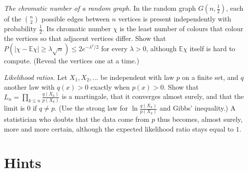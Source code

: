 \begin{exercise}[$\star\star$]\label{ex:chromatic}
\emph{The chromatic number of a random graph.} In the random graph $G(n,\frac12)$, each of the $\binom n2$ possible edges between $n$ vertices is
present independently with probability $\frac12$. Its chromatic number $\chi$ is the least number of colours that colour the vertices so
that adjacent vertices differ. Show that $P(|\chi-\mathbb E\chi|\ge\lambda\sqrt n)\le2e^{-\lambda^2/2}$ for every $\lambda>0$, although $\mathbb E\chi$ itself is hard to compute. (Reveal the vertices one at a time.)
\end{exercise}

\begin{exercise}[$\star\star$]\label{ex:likelihood}
\emph{Likelihood ratios.} Let $X_1,X_2,\ldots$ be independent with law $p$ on a finite set, and $q$ another law with $q(x)>0$ exactly when $p(x)>0$. Show
that $L_n=\prod_{k\le n}\frac{q(X_k)}{p(X_k)}$ is a martingale, that it converges almost surely, and that the limit is $0$ if $q\ne p$. (Use the strong law for
$\ln\frac{q(X_k)}{p(X_k)}$ and Gibbs' inequality.) A statistician who doubts that the data come from $p$ thus becomes, almost surely, more and
more certain, although the expected likelihood ratio stays equal to $1$.
\end{exercise}

\section{Hints}

